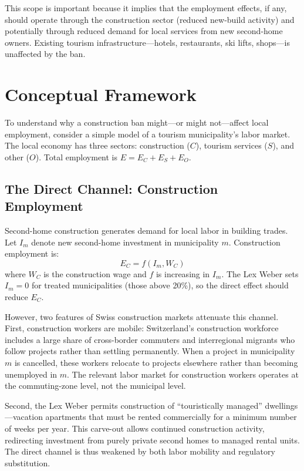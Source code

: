 \documentclass[12pt]{article}
\begin{document}
This scope is important because it implies that the employment effects, if any, should operate through the construction sector (reduced new-build activity) and potentially through reduced demand for local services from new second-home owners. Existing tourism infrastructure---hotels, restaurants, ski lifts, shops---is unaffected by the ban.

\section{Conceptual Framework}\label{sec:framework}

To understand why a construction ban might---or might not---affect local employment, consider a simple model of a tourism municipality's labor market. The local economy has three sectors: construction ($C$), tourism services ($S$), and other ($O$). Total employment is $E = E_C + E_S + E_O$.

\subsection{The Direct Channel: Construction Employment}

Second-home construction generates demand for local labor in building trades. Let $I_m$ denote new second-home investment in municipality $m$. Construction employment is:
\begin{equation}
E_C = f(I_m, W_C)
\end{equation}
where $W_C$ is the construction wage and $f$ is increasing in $I_m$. The Lex Weber sets $I_m = 0$ for treated municipalities (those above 20\%), so the direct effect should reduce $E_C$.

However, two features of Swiss construction markets attenuate this channel. First, construction workers are mobile: Switzerland's construction workforce includes a large share of cross-border commuters and interregional migrants who follow projects rather than settling permanently. When a project in municipality $m$ is cancelled, these workers relocate to projects elsewhere rather than becoming unemployed in $m$. The relevant labor market for construction workers operates at the commuting-zone level, not the municipal level.

Second, the Lex Weber permits construction of ``touristically managed'' dwellings---vacation apartments that must be rented commercially for a minimum number of weeks per year. This carve-out allows continued construction activity, redirecting investment from purely private second homes to managed rental units. The direct channel is thus weakened by both labor mobility and regulatory substitution.
\end{document}
